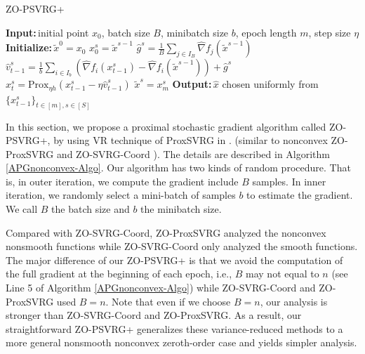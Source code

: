 \documentclass{article}
\newcommand*{\Po}{\text{Prox}}
\newcommand{\Initialize}{\textbf{Initialize:}{\,}}
\newcommand{\Input}{\textbf{Input:}{\,}}
\newcommand{\Output}{\textbf{Output:}{\,}}
\theoremstyle{definition}
\theoremstyle{remark}
\begin{document}
\begin{algorithm}\label{APGnonconvex-Algo}
\caption{ZO-PSVRG+}
\begin{algorithmic}[1]
\State\Input initial point $x_0$, batch size $B$, minibatch size $b$, epoch length $m$, step size $\eta$
\State\Initialize $\tilde{x}^0 = x_0$
\State $x_0^s = \tilde{x}^{s-1}$
\State $\hat{g}^s = \frac{1}{B} \sum_{j\in I_B} \hat{\nabla} f_j (\tilde{x}^{s-1})$
\State ${\hat{v}}_{t-1}^s = \frac{1}{b} \sum_{i\in I_b}\left(\hat{\nabla} f_{i}(x_{t-1}^s)-\hat{\nabla} f_{i}(\tilde{x}^{s-1})\right)+\hat{g}^s$
\State $x_{t}^s= \Po_{\eta h}(x_{t-1}^s - \eta \hat{v}_{t-1}^s)$
\EndFor
\State $\tilde{x}^{s} = x_m^s$
 \EndFor
 \State\Output $\hat{x}$ chosen uniformly from $\{x_{t-1}^s\}_{t\in [m], s\in [S]}$
\end{algorithmic}
\end{algorithm}
{\color{Violet}
In this section, we propose a proximal stochastic gradient algorithm called ZO-PSVRG+, by using VR technique of ProxSVRG in \cite{xiao2014proximal,reddi2016proximal,li2018simple}.
(similar to nonconvex ZO-ProxSVRG \cite{huang2019faster} and ZO-SVRG-Coord \cite{liu2018zeroth}). The details
are described in Algorithm \ref{APGnonconvex-Algo}.
{\color{Brown}
Our algorithm has two kinds of random procedure. That is, in outer iteration,
we compute the gradient include $B$ samples. In inner iteration, we randomly select a mini-batch of samples $b$ to estimate the gradient.}
 We call $B$ the batch size and $b$ the minibatch size.

Compared with ZO-SVRG-Coord, ZO-ProxSVRG analyzed the nonconvex nonsmooth functions while ZO-SVRG-Coord only analyzed the smooth functions. The major difference of our ZO-PSVRG+ is that
we avoid the computation of the full gradient at the beginning of each epoch, i.e., $B$ may not equal to $n$ (see Line 5 of Algorithm \ref{APGnonconvex-Algo}) while ZO-SVRG-Coord and ZO-ProxSVRG used $B = n$. Note that even if we choose $B = n$, our analysis is
stronger than ZO-SVRG-Coord and ZO-ProxSVRG. As a result, our straightforward ZO-PSVRG+ generalizes these variance-reduced methods to a more general nonsmooth nonconvex zeroth-order case and yields simpler analysis.
}
\end{document}

